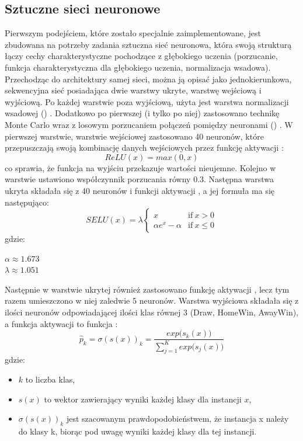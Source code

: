         \subsection{Sztuczne sieci neuronowe}
        \label{SNN-param}
        \noindent
        Pierwszym podejściem, które zostało specjalnie zaimplementowane, jest zbudowana na potrzeby zadania sztuczna sieć neuronowa, która swoją strukturą łączy cechy charakterystyczne pochodzące z głębokiego uczenia (porzucanie, funkcja charakterystyczna dla głębokiego uczenia, normalizacja wsadowa). Przechodząc do architektury samej sieci, można ją opisać jako jednokierunkowa, sekwencyjna sieć posiadająca dwie warstwy ukryte, warstwę wejściową i wyjściową. Po każdej warstwie poza wyjściową, użyta jest warstwa normalizacji wsadowej () \cite{BatchNormalization}. Dodatkowo po pierwszej (i tylko po niej) zastosowano technikę Monte Carlo wraz z losowym porzucaniem połączeń pomiędzy neuronami () \cite{MCDropout} \cite{Dropout} \cite{Dropout2}. W pierwszej warstwie, warstwie wejściowej zastosowano 40 neuronów, które przepuszczają swoją kombinację danych wejściowych przez funkcję aktywacji : \[ReLU(x) = max(0, x)\] co sprawia, że funkcja na wyjściu przekazuje wartości nieujemne. Kolejno w warstwie  ustawiono współczynnik porzucania równy 0.3. Następna warstwa ukryta składała się z 40 neuronów i funkcji aktywacji  \cite{SELU}, a jej formuła ma się następująco:
        \[
        SELU(x) = \lambda
        \begin{cases}
            x &  \text{if}\ x > 0\\
            \alpha e^{x} - \alpha &  \text{if}\ x \le 0
        \end{cases}
        \]
        gdzie:
        \begin{center}
            $\alpha \approx 1.673$ \\ 
            $\lambda \approx 1.051$
        \end{center}
        Następnie w warstwie ukrytej również zastosowano funkcję aktywacji , lecz tym razem umieszczono w niej zaledwie 5 neuronów. Warstwa wyjściowa składała się z ilości neuronów odpowiadającej ilości klas równej 3 (Draw, HomeWin, AwayWin), a funkcja aktywacji to funkcja :
        \[
        \hat{p}_{k} = \sigma(s(x))_{k} = \frac{exp \big(s_{k}(x)\big)}{\sum_{j=1}^{K}exp \big(s_{j}(x)\big)}
        \]
        gdzie:
        \begin{itemize}
            \item $k$ to liczba klas,
            \item $s(x)$ to wektor zawierający wyniki każdej klasy dla instancji $x$,
            \item $\sigma(s(x))_{k}$ jest szacowanym prawdopodobieństwem, że instancja x należy do klasy k, biorąc pod uwagę wyniki każdej klasy dla tej instancji.
        \end{itemize}
